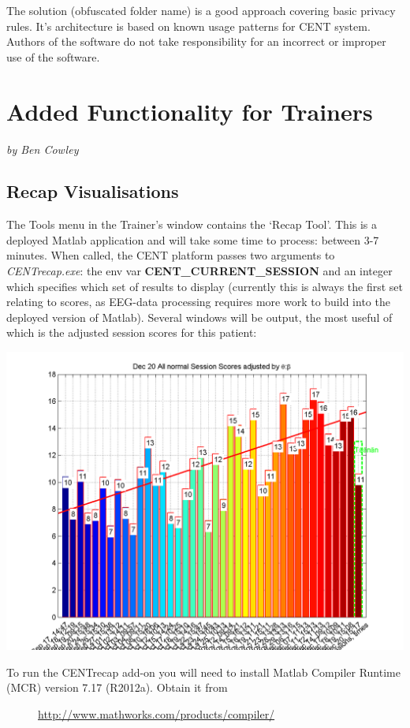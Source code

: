 \documentclass[letterpaper,10pt,english]{sphinxmanual}
\begin{document}
The solution (obfuscated folder name) is a good approach covering basic privacy rules. It's architecture is based on known usage patterns for CENT system. Authors of the software do not take responsibility for an incorrect or improper use of the software.


\section{\textbf{Added Functionality for Trainers}}
\label{index:added-functionality-for-trainers}\label{index:added-func-train}
\emph{by Ben Cowley}


\subsection{\textbf{Recap Visualisations}}
\label{index:recap-visualisations}
The Tools menu in the Trainer's window contains the `Recap Tool'. This is a deployed Matlab application and will take some time to process: between 3-7 minutes. When called, the CENT platform passes two arguments to \emph{CENTrecap.exe}: the env var \textbf{CENT\_CURRENT\_SESSION} and an integer which specifies which set of results to display (currently this is always the first set relating to scores, as EEG-data processing requires more work to build into the deployed version of Matlab).
Several windows will be output, the most useful of which is the adjusted session scores for this patient:

{\hfill\includegraphics{AdjustedSessionScores.png}\hfill}
\begin{description}
\item[{To run the CENTrecap add-on you will need to install Matlab Compiler Runtime (MCR) version 7.17 (R2012a). Obtain it from}] \leavevmode
\href{http://www.mathworks.com/products/compiler/}{http://www.mathworks.com/products/compiler/}

\end{description}
\end{document}
